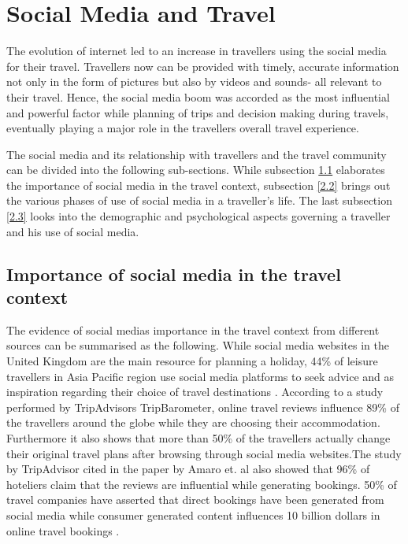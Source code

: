
\section{Social Media and Travel}

The evolution of internet led to an increase in travellers using the social media for their travel. Travellers now can be provided with timely, accurate information not only in the form of pictures but also by videos and sounds- all relevant to their travel. Hence, the social media boom was accorded as the most influential and powerful factor while planning of trips and decision making during travels, eventually playing a major role in the traveller\textquotesingle s overall travel experience.

The social media and its relationship with travellers and the travel community can be divided into the following sub-sections. While subsection \ref{2.1} elaborates the importance of social media in the travel context, subsection \ref{2.2} brings out the various phases of use of social media in a traveller's life. The last subsection \ref{2.3} looks into the demographic and psychological aspects governing a traveller and his use of social media.

\subsection{Importance of social media in the travel context}\label{2.1}

The evidence of social media\textquotesingle s importance in the travel context from different sources can be summarised as the following. While social media websites in the United Kingdom are the main resource for planning a holiday, 44\% of leisure travellers in Asia Pacific region use social media platforms to seek advice and as inspiration regarding their choice of travel destinations \cite{eMarketer, 2013}\cite{amaro2016travelers}. According to a study performed by TripAdvisor\textquotesingle s TripBarometer, online travel reviews influence 89\% of the travellers around the globe while they are choosing their accommodation. Furthermore it also shows that more than 50\% of the travellers actually change their original travel plans after browsing through social media websites\cite{amaro2016travelers}.The study by TripAdvisor cited in the paper by Amaro et. al also showed that 96\% of hoteliers claim that the reviews are influential while generating bookings. 50\% of travel companies have asserted that direct bookings have been generated from social media while consumer generated content influences 10 billion dollars in online travel bookings \cite{amaro2016travelers}.

